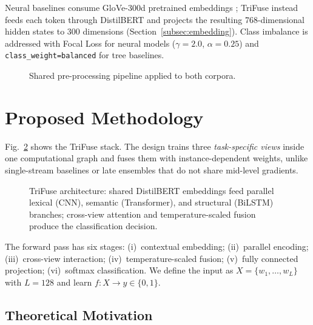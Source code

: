 \documentclass[10pt,twocolumn,a4paper]{article}
\begin{document}
Neural baselines consume GloVe-300d pretrained embeddings \citep{ref29}; TriFuse instead feeds each token through DistilBERT and projects the resulting 768-dimensional hidden states to 300 dimensions (Section~\ref{subsec:embedding}). Class imbalance is addressed with Focal Loss \citep{ref23} for neural models ($\gamma{=}2.0$, $\alpha{=}0.25$) and \texttt{class\_weight=balanced} for tree baselines.

\begin{figure}[!t]
\centering

\caption{Shared pre-processing pipeline applied to both corpora.}
\label{fig:preprocessing}
\end{figure}

\section{Proposed Methodology}\label{sec:method}

Fig.~\ref{fig:architecture} shows the TriFuse stack. The design trains three \emph{task-specific views} inside one computational graph and fuses them with instance-dependent weights, unlike single-stream baselines \citep{ref7,ref8} or late ensembles \citep{ref14} that do not share mid-level gradients.

\begin{figure}[!t]
\centering

\caption{TriFuse architecture: shared DistilBERT embeddings feed parallel lexical (CNN), semantic (Transformer), and structural (BiLSTM) branches; cross-view attention and temperature-scaled fusion produce the classification decision.}
\label{fig:architecture}
\end{figure}

The forward pass has six stages: (i)~contextual embedding; (ii)~parallel encoding; (iii)~cross-view interaction; (iv)~temperature-scaled fusion; (v)~fully connected projection; (vi)~softmax classification. We define the input as $X = \{w_1, \ldots, w_L\}$ with $L{=}128$ and learn $f: X \rightarrow y \in \{0,1\}$.

\subsection{Theoretical Motivation}\label{subsec:motivation}
\end{document}
